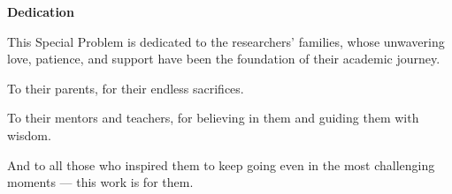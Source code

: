 \begin{center}
	\textbf{Dedication}
\end{center}

This Special Problem is dedicated to the researchers’ families, whose unwavering love, patience, and support have been the foundation of their academic journey.

To their parents, for their endless sacrifices.

To their mentors and teachers, for believing in them and guiding them with wisdom.

And to all those who inspired them to keep going even in the most challenging moments — this work is for them.